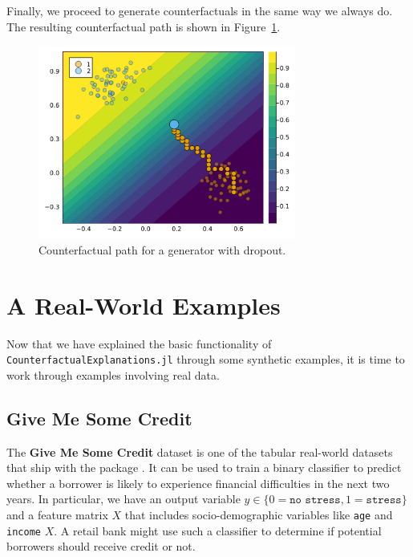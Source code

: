 \documentclass{juliacon}
\begin{document}
Finally, we proceed to generate counterfactuals in the same way we
always do. The resulting counterfactual path is shown in
Figure~\ref{fig-dropout}.

\begin{figure}

{\centering \includegraphics[width=3.33333in,height=2.5in]{www/dropout.png}

}

\caption{\label{fig-dropout}Counterfactual path for a generator with
dropout.}

\end{figure}

\hypertarget{sec-emp}{%
\section{A Real-World Examples}\label{sec-emp}}

Now that we have explained the basic functionality of
\texttt{CounterfactualExplanations.jl} through some synthetic examples,
it is time to work through examples involving real data.

\hypertarget{give-me-some-credit}{%
\subsection{Give Me Some Credit}\label{give-me-some-credit}}

The \textbf{Give Me Some Credit} dataset is one of the tabular
real-world datasets that ship with the package \cite{kaggle2011give}. It
can be used to train a binary classifier to predict whether a borrower
is likely to experience financial difficulties in the next two years. In
particular, we have an output variable
\(y \in \{0=\texttt{no stress},1=\texttt{stress}\}\) and a feature
matrix \(X\) that includes socio-demographic variables like \texttt{age}
and \texttt{income} \(X\). A retail bank might use such a classifier to
determine if potential borrowers should receive credit or not.
\end{document}
